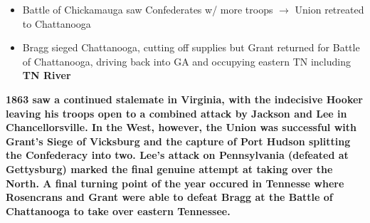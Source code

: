 \documentclass[a4paper]{article}
\begin{document}
{\begin{itemize}
        \begin{itemize}
            \item Battle of Chickamauga saw Confederates w/ more troops $\to$ Union retreated to Chattanooga
            \item Bragg sieged Chattanooga, cutting off supplies but Grant returned for Battle of Chattanooga, driving back into GA and occupying eastern TN including \textbf{TN River} 
        \end{itemize}
    \end{itemize}
    \textbf{1863 saw a continued stalemate in Virginia, with the indecisive Hooker leaving his troops open to a combined attack by Jackson and Lee in Chancellorsville. In the West, however, the Union was successful with Grant's Siege of Vicksburg and the capture of Port Hudson splitting the Confederacy into two. Lee's attack on Pennsylvania (defeated at Gettysburg) marked the final genuine attempt at taking over the North. A final turning point of the year occured in Tennesse where Rosencrans and Grant were able to defeat Bragg at the Battle of Chattanooga to take over eastern Tennessee.}}
\end{document}
